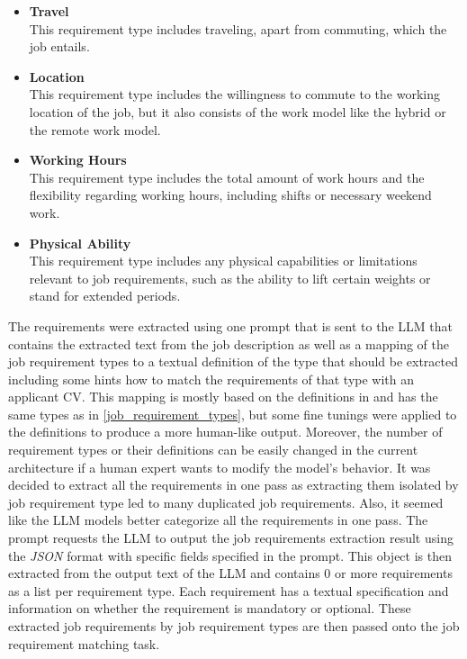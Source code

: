 \documentclass[draft,final]{thesisclass} %
\begin{document}
\begin{itemize}
    \item \textbf{Travel}\\
    This requirement type includes traveling, apart from commuting, which the job entails.
    \item \textbf{Location}\\
    This requirement type includes the willingness to commute to the working location of the job, but it also consists of the work model like the hybrid or the remote work model.
    \item \textbf{Working Hours}\\
    This requirement type includes the total amount of work hours and the flexibility regarding working hours, including shifts or necessary weekend work.
    \item \textbf{Physical Ability}\\
    This requirement type includes any physical capabilities or limitations relevant to job requirements, such as the ability to lift certain weights or stand for extended periods.
\end{itemize}
The requirements were extracted using one prompt that is sent to the \gls{LLM} that contains the extracted text from the job description as well as a mapping of the job requirement types to a textual definition of the type that should be extracted including some hints how to match the requirements of that type with an applicant \acs{CV}.
This mapping is mostly based on the definitions in \textcite{job_requirement_types} and has the same types as in \ref{job_requirement_types}, but some fine tunings were applied to the definitions to produce a more human-like output.
Moreover, the number of requirement types or their definitions can be easily changed in the current architecture if a human expert wants to modify the model's behavior.
It was decided to extract all the requirements in one pass as extracting them isolated by job requirement type led to many duplicated job requirements.
Also, it seemed like the \gls{LLM} models better categorize all the requirements in one pass.
The prompt requests the \gls{LLM} to output the job requirements extraction result using the \textit{JSON} format with specific fields specified in the prompt.
This  object is then extracted from the output text of the \gls{LLM} and contains $0$ or more requirements as a list per requirement type.
Each requirement has a textual specification and information on whether the requirement is mandatory or optional.
These extracted job requirements by job requirement types are then passed onto the job requirement matching task.
\end{document}
